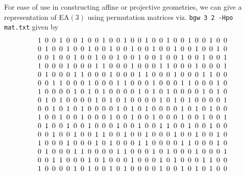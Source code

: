 \documentclass[a4paper,10pt]{article}
\begin{document}
For ease of use in constructing affine or projective geometries, we can give a representation of EA$(3)$ using permutation matrices viz. {\tt bgw 3 2 -Hpo mat.txt} given by
\[
\arraycolsep=2.5pt\def\arraystretch{1.0}
 \begin{array}{rrrrrrrrrrrrrrrrrrrrrrrrrrr}
1 & 0 & 0 & 1 & 0 & 0 & 1 & 0 & 0 & 1 & 0 & 0 & 1 & 0 & 0 & 1 & 0 & 0 & 1 & 0 & 0 & 1 & 0 & 0 & 1 & 0 & 0 \\
0 & 1 & 0 & 0 & 1 & 0 & 0 & 1 & 0 & 0 & 1 & 0 & 0 & 1 & 0 & 0 & 1 & 0 & 0 & 1 & 0 & 0 & 1 & 0 & 0 & 1 & 0 \\
0 & 0 & 1 & 0 & 0 & 1 & 0 & 0 & 1 & 0 & 0 & 1 & 0 & 0 & 1 & 0 & 0 & 1 & 0 & 0 & 1 & 0 & 0 & 1 & 0 & 0 & 1 \\
1 & 0 & 0 & 0 & 1 & 0 & 0 & 0 & 1 & 1 & 0 & 0 & 0 & 1 & 0 & 0 & 0 & 1 & 1 & 0 & 0 & 0 & 1 & 0 & 0 & 0 & 1 \\
0 & 1 & 0 & 0 & 0 & 1 & 1 & 0 & 0 & 0 & 1 & 0 & 0 & 0 & 1 & 1 & 0 & 0 & 0 & 1 & 0 & 0 & 0 & 1 & 1 & 0 & 0 \\
0 & 0 & 1 & 1 & 0 & 0 & 0 & 1 & 0 & 0 & 0 & 1 & 1 & 0 & 0 & 0 & 1 & 0 & 0 & 0 & 1 & 1 & 0 & 0 & 0 & 1 & 0 \\
1 & 0 & 0 & 0 & 0 & 1 & 0 & 1 & 0 & 1 & 0 & 0 & 0 & 0 & 1 & 0 & 1 & 0 & 1 & 0 & 0 & 0 & 0 & 1 & 0 & 1 & 0 \\
0 & 1 & 0 & 1 & 0 & 0 & 0 & 0 & 1 & 0 & 1 & 0 & 1 & 0 & 0 & 0 & 0 & 1 & 0 & 1 & 0 & 1 & 0 & 0 & 0 & 0 & 1 \\
0 & 0 & 1 & 0 & 1 & 0 & 1 & 0 & 0 & 0 & 0 & 1 & 0 & 1 & 0 & 1 & 0 & 0 & 0 & 0 & 1 & 0 & 1 & 0 & 1 & 0 & 0 \\
1 & 0 & 0 & 1 & 0 & 0 & 1 & 0 & 0 & 0 & 1 & 0 & 0 & 1 & 0 & 0 & 1 & 0 & 0 & 0 & 1 & 0 & 0 & 1 & 0 & 0 & 1 \\
0 & 1 & 0 & 0 & 1 & 0 & 0 & 1 & 0 & 0 & 0 & 1 & 0 & 0 & 1 & 0 & 0 & 1 & 1 & 0 & 0 & 1 & 0 & 0 & 1 & 0 & 0 \\
0 & 0 & 1 & 0 & 0 & 1 & 0 & 0 & 1 & 1 & 0 & 0 & 1 & 0 & 0 & 1 & 0 & 0 & 0 & 1 & 0 & 0 & 1 & 0 & 0 & 1 & 0 \\
1 & 0 & 0 & 0 & 1 & 0 & 0 & 0 & 1 & 0 & 1 & 0 & 0 & 0 & 1 & 1 & 0 & 0 & 0 & 0 & 1 & 1 & 0 & 0 & 0 & 1 & 0 \\
0 & 1 & 0 & 0 & 0 & 1 & 1 & 0 & 0 & 0 & 0 & 1 & 1 & 0 & 0 & 0 & 1 & 0 & 1 & 0 & 0 & 0 & 1 & 0 & 0 & 0 & 1 \\
0 & 0 & 1 & 1 & 0 & 0 & 0 & 1 & 0 & 1 & 0 & 0 & 0 & 1 & 0 & 0 & 0 & 1 & 0 & 1 & 0 & 0 & 0 & 1 & 1 & 0 & 0 \\
1 & 0 & 0 & 0 & 0 & 1 & 0 & 1 & 0 & 0 & 1 & 0 & 1 & 0 & 0 & 0 & 0 & 1 & 0 & 0 & 1 & 0 & 1 & 0 & 1 & 0 & 0 \\

\end{array}\]
\end{document}
